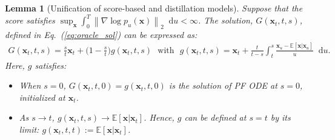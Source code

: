 \documentclass{article} \usepackage{iclr2024_coNFErence,times}
\def\eqref#1{equation~\ref{#1}}
\newcommand{\norm}[1]{\left\lVert#1\right\rVert}
\def\eqref#1{(\ref{#1})}
\def\eqref#1{(\ref{#1})}
\newtheorem{lemma}[theorem]{Lemma}
\theoremstyle{definition}
\theoremstyle{remark}
\newcommand*\diff{\mathop{}\!\mathrm{d}}
\begin{document}
\begin{lemma}[Unification of score-based and distillation models]\label{th:unification} Suppose that the score satisfies $\sup_{\mathbf{x}}\int_{0}^{T}\norm{\nabla\log p_u(\mathbf{x})}_2 \diff u <\infty$. 
    The solution, $G(\mathbf{x}_{t},t,s)$, defined in Eq.~\eqref{eq:oracle_sol} can be expressed as:
    \begin{align*}
        G(\mathbf{x}_{t},t,s)=\frac{s}{t}\mathbf{x}_{t}+\Big(1-\frac{s}{t}\Big)g(\mathbf{x}_{t},t,s) \,\,\text{ with  }\,\, g(\mathbf{x}_{t},t,s)=\mathbf{x}_{t}+\frac{t}{t-s}\int_{t}^{s}\frac{\mathbf{x}_{u}-\mathbb{E}[\mathbf{x}\vert\mathbf{x}_{u}]}{u}\diff u.
    \end{align*}
    Here, $g$ satisfies:
    \begin{itemize}
        \item When $s=0$, $G(\mathbf{x}_{t},t,0)=g(\mathbf{x}_{t},t,0) $ is the solution of PF ODE at $s=0$, initialized at $\mathbf{x}_t$. 
        \item As $s\rightarrow t$, $g(\mathbf{x}_{t},t,s)\rightarrow \mathbb{E}[\mathbf{x}\vert\mathbf{x}_{t}]$. Hence, $g$ can be defined at $s=t$ by its limit: $g(\mathbf{x}_{t},t,t):=\mathbb{E}[\mathbf{x}\vert\mathbf{x}_{t}]$. \end{itemize}
\end{lemma}
\end{document}
